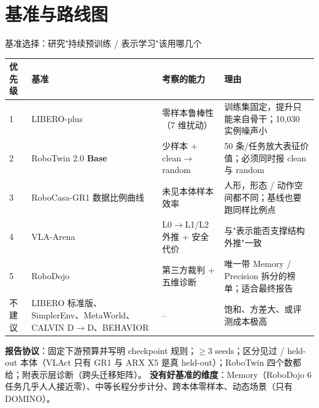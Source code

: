 \documentclass[aspectratio=169,10pt]{beamer}
\newcommand{\con}[1]{\textcolor{negative}{#1}}
\begin{document}
\section{基准与路线图}
\begin{frame}{基准选择：研究"持续预训练 / 表示学习"该用哪几个}
  \begin{center}\footnotesize\setlength{\tabcolsep}{4pt}
  \begin{tabular}{p{0.9cm}p{2.7cm}p{3.3cm}p{6.6cm}}
    \toprule
    优先级 & 基准 & 考察的能力 & 理由 \\
    \midrule
    1 & LIBERO-plus & 零样本鲁棒性（7 维扰动） & 训练集固定，提升只能来自骨干；10,030 实例噪声小 \\
    2 & RoboTwin 2.0 \textbf{Base} & 少样本 + clean$\to$random & 50 条/任务放大表征价值；必须同时报 clean 与 random \\
    3 & RoboCasa-GR1 数据比例曲线 & 未见本体样本效率 & 人形，形态 / 动作空间都不同；基线也要跑同样比例点 \\
    4 & VLA-Arena & L0$\to$L1/L2 外推 + 安全代价 & 与"表示能否支撑结构外推"一致 \\
    5 & RoboDojo & 第三方裁判 + 五维诊断 & 唯一带 Memory / Precision 拆分的榜单；适合最终报告 \\
    \midrule
    \con{不建议} & LIBERO 标准版、SimplerEnv、MetaWorld、CALVIN D$\to$D、BEHAVIOR & – & 饱和、方差大、或评测成本极高 \\
    \bottomrule
  \end{tabular}
  \end{center}
  \vspace{4pt}
  \textbf{报告协议}：固定下游预算并写明 checkpoint 规则；$\ge$3 seeds；区分见过 / held-out 本体（VLAct 只有 GR1 与 ARX X5 是真 held-out）；RoboTwin 四个数都给；附表示层诊断（跨头迁移矩阵）。
  \vspace{4pt}
  \textbf{没有好基准的维度}：Memory（RoboDojo 6 任务几乎人人接近零）、中等长程分步计分、跨本体零样本、动态场景（只有 DOMINO）。
\end{frame}
\end{document}
